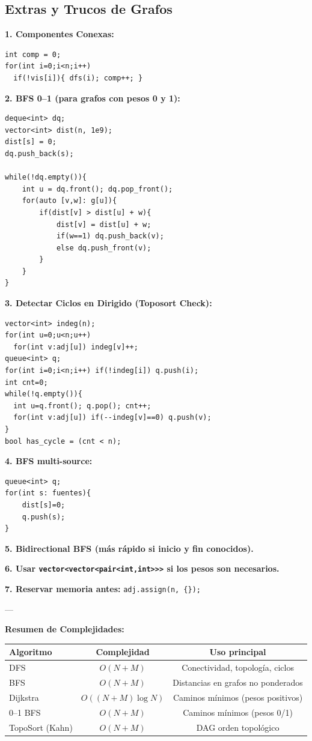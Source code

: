 \documentclass{article}
\begin{document}
\subsection{Extras y Trucos de Grafos}

\textbf{1. Componentes Conexas:}
\begin{lstlisting}[style=cppstyle]
int comp = 0;
for(int i=0;i<n;i++)
  if(!vis[i]){ dfs(i); comp++; }
\end{lstlisting}

\textbf{2. BFS 0–1 (para grafos con pesos 0 y 1):}
\begin{lstlisting}[style=cppstyle]
deque<int> dq;
vector<int> dist(n, 1e9);
dist[s] = 0;
dq.push_back(s);

while(!dq.empty()){
    int u = dq.front(); dq.pop_front();
    for(auto [v,w]: g[u]){
        if(dist[v] > dist[u] + w){
            dist[v] = dist[u] + w;
            if(w==1) dq.push_back(v);
            else dq.push_front(v);
        }
    }
}
\end{lstlisting}

\textbf{3. Detectar Ciclos en Dirigido (Toposort Check):}
\begin{lstlisting}[style=cppstyle]
vector<int> indeg(n);
for(int u=0;u<n;u++)
  for(int v:adj[u]) indeg[v]++;
queue<int> q;
for(int i=0;i<n;i++) if(!indeg[i]) q.push(i);
int cnt=0;
while(!q.empty()){
  int u=q.front(); q.pop(); cnt++;
  for(int v:adj[u]) if(--indeg[v]==0) q.push(v);
}
bool has_cycle = (cnt < n);
\end{lstlisting}

\textbf{4. BFS multi-source:}
\begin{lstlisting}[style=cppstyle]
queue<int> q;
for(int s: fuentes){
    dist[s]=0;
    q.push(s);
}
\end{lstlisting}

\textbf{5. Bidirectional BFS (más rápido si inicio y fin conocidos).}

\textbf{6. Usar \lstinline|vector<vector<pair<int,int>>>| si los pesos son necesarios.}

\textbf{7. Reservar memoria antes:} \lstinline|adj.assign(n, {});|

---

\textbf{Resumen de Complejidades:}

\begin{center}
\begin{tabular}{lcc}
\hline
Algoritmo & Complejidad & Uso principal \\
\hline
DFS & \(O(N+M)\) & Conectividad, topología, ciclos \\
BFS & \(O(N+M)\) & Distancias en grafos no ponderados \\
Dijkstra & \(O((N+M)\log N)\) & Caminos mínimos (pesos positivos) \\
0–1 BFS & \(O(N+M)\) & Caminos mínimos (pesos 0/1) \\
TopoSort (Kahn) & \(O(N+M)\) & DAG orden topológico \\
\hline
\end{tabular}
\end{center}
\end{document}
